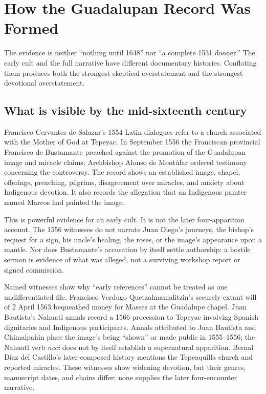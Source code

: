 \section{How the Guadalupan Record Was Formed}

The evidence is neither “nothing until 1648” nor “a complete 1531 dossier.” The early cult and the full narrative have different documentary histories. Conflating them produces both the strongest skeptical overstatement and the strongest devotional overstatement.

\subsection{What is visible by the mid-sixteenth century}

Francisco Cervantes de Salazar's 1554 Latin dialogues refer to a church associated with the Mother of God at Tepeyac. In September 1556 the Franciscan provincial Francisco de Bustamante preached against the promotion of the Guadalupan image and miracle claims; Archbishop Alonso de Montúfar ordered testimony concerning the controversy. The record shows an established image, chapel, offerings, preaching, pilgrims, disagreement over miracles, and anxiety about Indigenous devotion. It also records the allegation that an Indigenous painter named Marcos had painted the image.

This is powerful evidence for an early cult. It is not the later four-apparition account. The 1556 witnesses do not narrate Juan Diego's journeys, the bishop's request for a sign, his uncle's healing, the roses, or the image's appearance upon a mantle. Nor does Bustamante's accusation by itself settle authorship: a hostile sermon is evidence of what was alleged, not a surviving workshop report or signed commission.

Named witnesses show why “early references” cannot be treated as one undifferentiated file. Francisco Verdugo Quetzalmamalitzin's securely extant will of 2 April 1563 bequeathed money for Masses at the Guadalupe chapel. Juan Bautista's Nahuatl annals record a 1566 procession to Tepeyac involving Spanish dignitaries and Indigenous participants. Annals attributed to Juan Bautista and Chimalpahin place the image's being “shown” or made public in 1555--1556; the Nahuatl verb \emph{neci} does not by itself establish a supernatural apparition. Bernal Díaz del Castillo's later-composed history mentions the Tepeaquilla church and reported miracles. These witnesses show widening devotion, but their genres, manuscript dates, and chains differ; none supplies the later four-encounter narrative.


